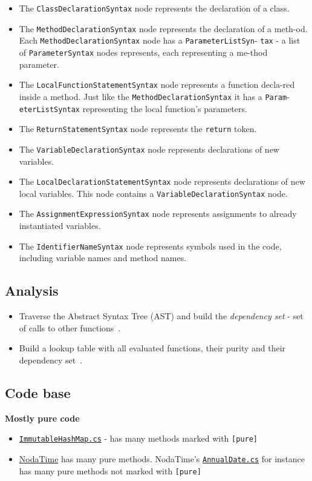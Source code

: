 \documentclass[a4paper,12pt]{article}
\begin{document}
\begin{itemize}
  \item The \texttt{ClassDeclarationSyntax} node represents the declaration of a class.
  \item The \texttt{MethodDeclarationSyntax} node represents the declaration of a meth-od. Each \texttt{MethodDeclarationSyntax} node has a \texttt{ParameterListSyn}- \texttt{tax} - a list of \texttt{ParameterSyntax} nodes represents, each representing a me-thod parameter.
  \item The \texttt{LocalFunctionStatementSyntax} node represents a function decla-red inside a method. Just like the \texttt{MethodDeclarationSyntax} it has a \texttt{Param}-\texttt{eterListSyntax} representing the local function's parameters.
  \item The \texttt{ReturnStatementSyntax} node represents the \texttt{return} token.
  \item The \texttt{VariableDeclarationSyntax} node represents declarations of new variables.
  \item The \texttt{LocalDeclarationStatementSyntax} node represents declarations of new local variables. This node contains a \texttt{VariableDeclarationSyntax} node.
  \item The \texttt{AssignmentExpressionSyntax} node represents assignments to already instantiated variables.
  \item The \texttt{IdentifierNameSyntax} node represents symbols used in the code, including variable names and method names.
\end{itemize}

\subsection{Analysis}
\begin{itemize}
  \item Traverse the Abstract Syntax Tree (AST) and build the \textit{dependency set} - set of calls to other functions~\cite{pitidis2010purity}.
  \item Build a lookup table with all evaluated functions, their purity and their dependency set~\cite{pitidis2010purity}.
\end{itemize}

\subsection{Code base} \label{sub:Code base}
\textbf{Mostly pure code}
\begin{itemize}
  \item \href{https://github.com/dotnet/roslyn/blob/master/src/Workspaces/SharedUtilitiesAndExtensions/Compiler/Core/Utilities/CompilerUtilities/ImmutableHashMap.cs}{\texttt{ImmutableHashMap.cs}} - has many methods marked with \texttt{[pure]}
  \item \href{https://github.com/nodatime/nodatime/blob/master/src/NodaTime}{NodaTime} has many pure methods. NodaTime's \href{https://github.com/nodatime/nodatime/blob/master/src/NodaTime/AnnualDate.cs}{\texttt{AnnualDate.cs}} for instance has many pure methods not marked with \texttt{[pure]}
\end{itemize}
\end{document}
